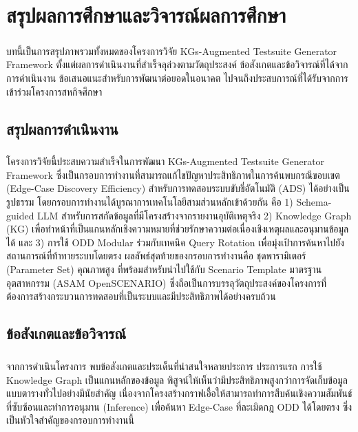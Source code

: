 \chapter{สรุปผลการศึกษาและวิจารณ์ผลการศึกษา}\label{ch:conclusion}

\paragraph{}
บทนี้เป็นการสรุปภาพรวมทั้งหมดของโครงการวิจัย KGs-Augmented Testsuite Generator Framework ตั้งแต่ผลการดำเนินงานที่สำเร็จลุล่วงตามวัตถุประสงค์ ข้อสังเกตและข้อวิจารณ์ที่ได้จากการดำเนินงาน ข้อเสนอแนะสำหรับการพัฒนาต่อยอดในอนาคต ไปจนถึงประสบการณ์ที่ได้รับจากการเข้าร่วมโครงการสหกิจศึกษา

\section{สรุปผลการดำเนินงาน}
\paragraph{}
โครงการวิจัยนี้ประสบความสำเร็จในการพัฒนา KGs-Augmented Testsuite Generator Framework ซึ่งเป็นกรอบการทำงานที่สามารถแก้ไขปัญหาประสิทธิภาพในการค้นพบกรณีขอบเขต (Edge-Case Discovery Efficiency) สำหรับการทดสอบระบบขับขี่อัตโนมัติ (ADS) ได้อย่างเป็นรูปธรรม โดยกรอบการทำงานได้บูรณาการเทคโนโลยีสามส่วนหลักเข้าด้วยกัน คือ 1) Schema-guided LLM สำหรับการสกัดข้อมูลที่มีโครงสร้างจากรายงานอุบัติเหตุจริง 2) Knowledge Graph (KG) เพื่อทำหน้าที่เป็นแกนหลักเชิงความหมายที่ช่วยรักษาความต่อเนื่องเชิงเหตุผลและอนุมานข้อมูลได้ และ 3) การใช้ ODD Modular ร่วมกับเทคนิค Query Rotation เพื่อมุ่งเป้าการค้นหาไปยังสถานการณ์ที่ท้าทายระบบโดยตรง ผลลัพธ์สุดท้ายของกรอบการทำงานคือ ชุดพารามิเตอร์ (Parameter Set) คุณภาพสูง ที่พร้อมสำหรับนำไปใช้กับ Scenario Template มาตรฐานอุตสาหกรรม (ASAM OpenSCENARIO) ซึ่งถือเป็นการบรรลุวัตถุประสงค์ของโครงการที่ต้องการสร้างกระบวนการทดสอบที่เป็นระบบและมีประสิทธิภาพได้อย่างครบถ้วน

\section{ข้อสังเกตและข้อวิจารณ์}
\paragraph{}
จากการดำเนินโครงการ พบข้อสังเกตและประเด็นที่น่าสนใจหลายประการ ประการแรก การใช้ Knowledge Graph เป็นแกนหลักของข้อมูล พิสูจน์ให้เห็นว่ามีประสิทธิภาพสูงกว่าการจัดเก็บข้อมูลแบบตารางทั่วไปอย่างมีนัยสำคัญ เนื่องจากโครงสร้างกราฟเอื้อให้สามารถทำการสืบค้นเชิงความสัมพันธ์ที่ซับซ้อนและทำการอนุมาน (Inference) เพื่อค้นหา Edge-Case ที่ละเมิดกฎ ODD ได้โดยตรง ซึ่งเป็นหัวใจสำคัญของกรอบการทำงานนี้

